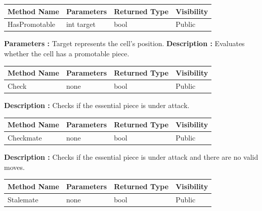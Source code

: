 \documentclass[12pt]{article}
\begin{document}
    \begin{table}[H]
        \begin{tabular}{|l|l|l|l|}
            \hline
            \rowcolor[HTML]{EFEFEF}
            \cellcolor[HTML]{EFEFEF}\textbf{Method Name} & \textbf{Parameters} & \textbf{Returned Type} & \textbf{Visibility} \\ \hline
            HasPromotable                                & int target          & bool                   & Public              \\ \hline
        \end{tabular}
    \end{table}


    \textbf{Parameters :} Target represents the cell's position.
    \textbf{Description :} Evaluates whether the cell has a promotable piece.

    \begin{table}[H]
        \begin{tabular}{|l|l|l|l|}
            \hline
            \rowcolor[HTML]{EFEFEF}
            \cellcolor[HTML]{EFEFEF}\textbf{Method Name} & \textbf{Parameters} & \textbf{Returned Type} & \textbf{Visibility} \\ \hline
            Check                                        & none                & bool                   & Public              \\ \hline
        \end{tabular}
    \end{table}

    \textbf{Description :} Checks if the essential piece is under attack.

    \begin{table}[H]
        \begin{tabular}{|l|l|l|l|}
            \hline
            \rowcolor[HTML]{EFEFEF}
            \cellcolor[HTML]{EFEFEF}\textbf{Method Name} & \textbf{Parameters} & \textbf{Returned Type} & \textbf{Visibility} \\ \hline
            Checkmate                                    & none                & bool                   & Public              \\ \hline
        \end{tabular}
    \end{table}

    \textbf{Description :} Checks if the essential piece is under attack and there are no valid moves.

    \begin{table}[H]
        \begin{tabular}{|l|l|l|l|}
            \hline
            \rowcolor[HTML]{EFEFEF}
            \cellcolor[HTML]{EFEFEF}\textbf{Method Name} & \textbf{Parameters} & \textbf{Returned Type} & \textbf{Visibility} \\ \hline
            Stalemate                                    & none                & bool                   & Public              \\ \hline
        \end{tabular}
    \end{table}
\end{document}
